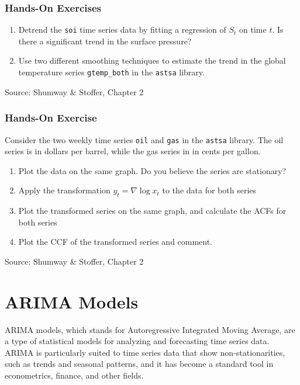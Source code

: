 \begin{tcolorbox}[colback=code]
\subsubsection*{Hands-On Exercises} 
\begin{enumerate}
  \item Detrend the \texttt{soi} time series data by fitting a regression of $S_t$ on time $t$. Is there a significant trend in the surface pressure?
  \item Use two different smoothing techniques to estimate the trend in the global temperature series \texttt{gtemp\_both} in the \texttt{astsa} library.
\end{enumerate}

{\footnotesize \vspace{\baselineskip} Source: Shumway \& Stoffer, Chapter 2}
\end{tcolorbox}

\begin{tcolorbox}[colback=code]
\subsubsection*{Hands-On Exercise} 
Consider the two weekly time series \texttt{oil} and \texttt{gas} in the  \texttt{astsa} library. The oil series is in dollars per barrel, while the gas series in in cents per gallon.
\begin{enumerate}
   \item Plot the data on the same graph. Do you believe the series are stationary?
   \item Apply the transformation $y_t = \nabla \log x_t$ to the data for both series
   \item Plot the transformed series on the same graph, and calculate the ACFs for both series
   \item Plot the CCF of the transformed series and comment.
\end{enumerate}

{\footnotesize \vspace{\baselineskip} Source: Shumway \& Stoffer, Chapter 2}
\end{tcolorbox}

\section{ARIMA Models}

ARIMA models, which stands for Autoregressive Integrated Moving Average, are a type of statistical models for analyzing and forecasting time series data. ARIMA is particularly suited to time series data that show non-stationarities, such as trends and seasonal patterns, and it has become a standard tool in econometrics, finance, and other fields.

